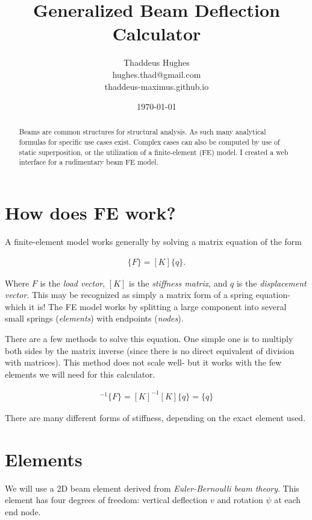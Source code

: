 \documentclass[10pt,letterpaper]{article}
\author{Thaddeus Hughes \\ hughes.thad@gmail.com \\ thaddeus-maximus.github.io}
\date{\today}
\title{Generalized Beam Deflection Calculator}
\begin{document}
	\maketitle
	
	\begin{abstract}
		Beams are common structures for structural analysis. As such many analytical formulas for specific use cases exist. Complex cases can also be computed by use of static superposition, or the utilization of a finite-element (FE) model. I created a web interface for a rudimentary beam FE model.
	\end{abstract}

	\section{How does FE work?}

	A finite-element model works generally by solving a matrix equation of the form

	\begin{align}
		\{F\} = [K]\{q\} .
	\end{align}

	Where ${F}$ is the \textit{load vector}, $[K]$ is the \textit{stiffness matrix}, and ${q}$ is the \textit{displacement vector}. This may be recognized as simply a matrix form of a spring equation- which it is! The FE model works by splitting a large component into several small springs (\textit{elements}) with endpoints (\textit{nodes}).

	There are a few methods to solve this equation. One simple one is to multiply both sides by the matrix inverse (since there is no direct equivalent of division with matrices). This method does not scale well- but it works with the few elements we will need for this calculator.

	\begin{align}
		[K]^{-1} \{F\} = [K]^{-1} [K]\{q\} = \{q\}
	\end{align}

	There are many different forms of stiffness, depending on the exact element used.

	\section{Elements}

	We will use a 2D beam element derived from \textit{Euler-Bernoulli beam theory}. This element has four degrees of freedom: vertical deflection $v$ and rotation $\psi$ at each end node.
\end{document}
